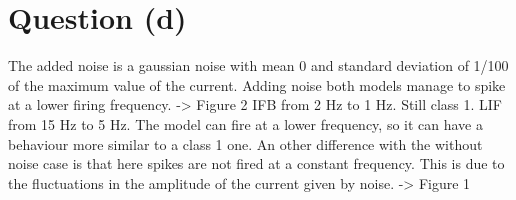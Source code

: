 \documentclass[11pt]{article}
\begin{document}
\section*{Question (d)}
The added noise is a gaussian noise with mean 0 and standard 
deviation of 1/100 of the maximum value of the current.
Adding noise both models manage to spike at a lower 
firing frequency. -> Figure 2
IFB from 2 Hz to 1 Hz. Still class 1.
LIF from 15 Hz to 5 Hz. The model can fire at a lower frequency,
so it can have a behaviour more similar to a class 1 one.
An other difference with the without noise case is that here 
spikes are not fired at a constant frequency. This is due to the 
fluctuations in the amplitude of the current given by noise. 
-> Figure 1
\end{document}
